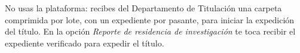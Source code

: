 \documentclass[11pt,a4paper]{article}
\begin{document}
{\small\tableofcontents}
\newpage
\begin{quevasahacer}
No usas la plataforma: recibes del Departamento de Titulación una carpeta comprimida por lote, con un expediente por pasante, para iniciar la expedición del título. En la opción \emph{Reporte de residencia de investigación} te toca recibir el expediente verificado para expedir el título.
\end{quevasahacer}



\end{document}
